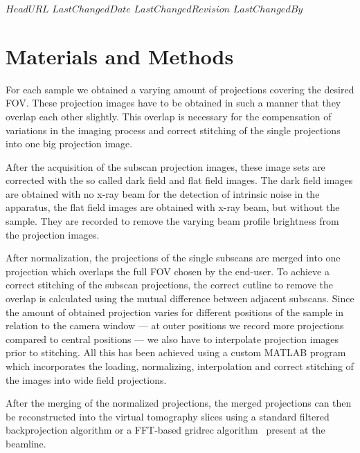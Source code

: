\svnidlong
{$HeadURL$}
{$LastChangedDate$}
{$LastChangedRevision$}
{$LastChangedBy$}
\section{Materials and Methods}
For each sample we obtained a varying amount of projections covering the desired FOV. These projection images have to be obtained in such a manner that they overlap each other slightly. This overlap is necessary for the compensation of variations in the imaging process and correct stitching of the single projections into one big projection image. 

After the acquisition of the subscan projection images, these image sets are corrected with the so called dark field and flat field images. The dark field images are obtained with no x-ray beam for the detection of intrinsic noise in the apparatus, the flat field images are obtained with x-ray beam, but without the sample. They are recorded to remove the varying beam profile brightness from the projection images.

After normalization, the projections of the single subscans are merged into one projection which overlaps the full FOV chosen by the end-user. To achieve a correct stitching of the subscan projections, the correct cutline to remove the overlap is calculated using the mutual difference between adjacent subscans. Since the amount of obtained projection varies for different positions of the sample in relation to the camera window --- at outer positions we record more projections compared to central positions --- we also have to interpolate projection images prior to stitching. All this has been achieved using a custom MATLAB\textsuperscript{\textregistered} program which incorporates the loading, normalizing, interpolation and correct stitching of the images into wide field projections.

After the merging of the normalized projections, the merged projections can then be reconstructed into the virtual tomography slices using a standard filtered backprojection algorithm or a FFT-based gridrec algorithm~\cite{Dowd2003} present at the beamline.
